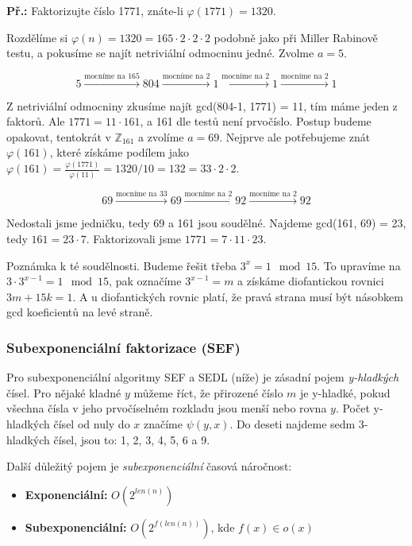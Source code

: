 \begin{exercise}
\textbf{Př.:} Faktorizujte číslo 1771, znáte-li $\varphi(1771) = 1320$.

Rozdělíme si $\varphi(n) = 1320 = 165 \cdot 2 \cdot 2 \cdot 2$ podobně jako při
Miller Rabinově testu, a pokusíme se najít netriviální odmocninu jedné. Zvolme
$a = 5$.

$$ 5 \xrightarrow{\text{mocníme na 165}} 804 \xrightarrow{\text{mocníme na 2}} 1
\xrightarrow{\text{mocníme na 2}} 1 \xrightarrow{\text{mocníme na 2}} 1$$

Z netriviální odmocniny zkusíme najít gcd(804-1, 1771) = 11, tím máme jeden z
faktorů. Ale $1771 = 11 \cdot 161$, a 161 dle testů není prvočíslo. Postup
budeme opakovat, tentokrát v $\mathbb{Z}_{161}$ a zvolíme $a = 69$. Nejprve ale
potřebujeme znát $\varphi(161)$, které získáme podílem jako $\varphi(161) =
\frac{\varphi(1771)}{\varphi(11)} = 1320/10 = 132 = 33 \cdot 2 \cdot 2$.

$$69 \xrightarrow{\text{mocníme na 33}} 69 \xrightarrow{\text{mocníme na 2}} 92
\xrightarrow{\text{mocníme na 2}} 92$$

Nedostali jsme jedničku, tedy 69 a 161 jsou soudělné. Najdeme gcd(161, 69) = 23,
tedy $161 = 23 \cdot 7$. Faktorizovali jsme $1771 = 7 \cdot 11 \cdot 23$.

Poznámka k té soudělnosti. Budeme řešit třeba $3^x = 1 \mod 15$. To upravíme na
$3\cdot 3^{x-1} = 1 \mod 15$, pak označíme $3^{x-1} = m$ a získáme diofantickou
rovnici $3m + 15k = 1$. A u diofantických rovnic platí, že pravá strana musí být
násobkem gcd koeficientů na levé straně.
\end{exercise}

\subsubsection{Subexponenciální faktorizace (SEF)}
Pro subexponenciální algoritmy SEF a SEDL (níže) je zásadní pojem
\textit{y-hladkých} čísel. Pro nějaké kladné $y$ můžeme říct, že přirozené číslo
$m$ je y-hladké, pokud všechna čísla v jeho prvočíselném rozkladu jsou menší
nebo rovna $y$. Počet y-hladkých čísel od nuly do $x$ značíme $\psi(y, x)$. Do
deseti najdeme sedm 3-hladkých čísel, jsou to: 1, 2, 3, 4, 5, 6 a 9.

Další důležitý pojem je \textit{subexponenciální} časová náročnost:
\begin{itemize}
\item \textbf{Exponenciální:} $O(2^{len(n)})$
\item \textbf{Subexponenciální:} $O(2^{f(len(n))})$, kde $f(x)\in o(x)$
\end{itemize}

